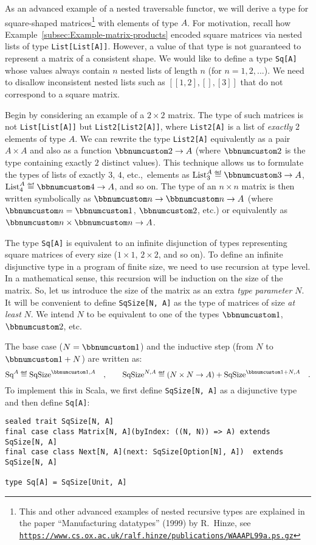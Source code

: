 As an advanced example of a nested traversable functor, we will derive
a type for square-shaped matrices\footnote{This and other advanced examples of nested recursive types are explained
in the paper \textsf{``}Manufacturing datatypes\textsf{''} (1999) by R.~Hinze,
see \texttt{\href{https://www.cs.ox.ac.uk/ralf.hinze/publications/WAAAPL99a.ps.gz}{https://www.cs.ox.ac.uk/ralf.hinze/publications/WAAAPL99a.ps.gz}}} with elements of type $A$. For motivation, recall how Example~\ref{subsec:Example-matrix-products}
encoded square matrices via nested lists of type \lstinline!List[List[A]]!.
However, a value of that type is not guaranteed to represent a matrix
of a consistent shape. We would like to define a type \lstinline!Sq[A]!
whose values always contain $n$ nested lists of length $n$ (for
$n=1,2,...$). We need to disallow inconsistent nested lists such
as $\left[\left[1,2\right],\left[\right],\left[3\right]\right]$ that
do not correspond to a square matrix.

Begin by considering an example of a $2\times2$ matrix. The type
of such matrices is not \lstinline!List[List[A]]! but \lstinline!List2[List2[A]]!,
where \lstinline!List2[A]! is a list of \emph{exactly} $2$ elements
of type $A$. We can rewrite the type \lstinline!List2[A]! equivalently
as a pair $A\times A$ and also as a function $\bbnum 2\rightarrow A$
(where $\bbnum 2$ is the type containing exactly $2$ distinct values).
This technique allows us to formulate the types of lists of exactly
$3$, $4$, etc.,~elements as $\text{List}_{3}^{A}\triangleq\bbnum 3\rightarrow A$,
$\text{List}_{4}^{A}\triangleq\bbnum 4\rightarrow A$, and so on.
The type of an $n\times n$ matrix is then written symbolically as
$\bbnum n\rightarrow\bbnum n\rightarrow A$ (where $\bbnum n=\bbnum 1$,
$\bbnum 2$, etc.) or equivalently as $\bbnum n\times\bbnum n\rightarrow A$.

The type \lstinline!Sq[A]! is equivalent to an infinite disjunction
of types representing square matrices of every size ($1\times1$,
$2\times2$, and so on). To define an infinite disjunctive type in
a program of finite size, we need to use recursion at type level.
In a mathematical sense, this recursion will be induction on the size
of the matrix. So, let us introduce the size of the matrix as an extra
\emph{type parameter} $N$. It will be convenient to define \lstinline!SqSize[N, A]!
as the type of matrices of size \emph{at least} $N$. We intend $N$
to be equivalent to one of the types $\bbnum 1$, $\bbnum 2$, etc. 

The base case ($N=\bbnum 1$) and the inductive step (from $N$ to
$\bbnum 1+N$) are written as:
\[
\text{Sq}^{A}\triangleq\text{SqSize}^{\bbnum 1,A}\quad,\quad\quad\text{SqSize}^{N,A}\triangleq\left(N\times N\rightarrow A\right)+\text{SqSize}^{\bbnum 1+N,A}\quad.
\]
To implement this in Scala, we first define \lstinline!SqSize[N, A]!
as a disjunctive type and then define \lstinline!Sq[A]!:
\begin{lstlisting}
sealed trait SqSize[N, A]
final case class Matrix[N, A](byIndex: ((N, N)) => A) extends SqSize[N, A]
final case class Next[N, A](next: SqSize[Option[N], A])  extends SqSize[N, A]

type Sq[A] = SqSize[Unit, A]
\end{lstlisting}

